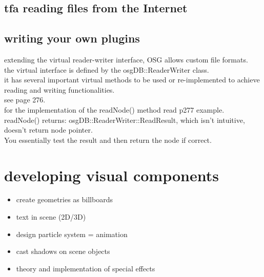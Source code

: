 \documentclass[a4paper,12pt]{book}
\begin{document}
\section{tfa reading files from the Internet}


\section{writing your own plugins}
extending the virtual reader-writer interface, OSG allows custom file formats.\\
\textrightarrow the virtual interface is defined by the osgDB::ReaderWriter class.\\
\textrightarrow it has several important virtual methods to be used or re-implemented to achieve reading and writing functionalities.\\
see page 276.\\

for the implementation of the readNode() method read p277 example.\\

readNode() returns: osgDB::ReaderWriter::ReadResult, which isn't intuitive, doesn't return node pointer.\\
You essentially test the result and then return the node if correct.\\

\chapter{developing visual components}

\begin{itemize}
\item create geometries as billboards
\item text in scene (2D/3D)
\item design particle system = animation
\item cast shadows on scene objects
\item theory and implementation of special effects
\end{itemize}
\end{document}
